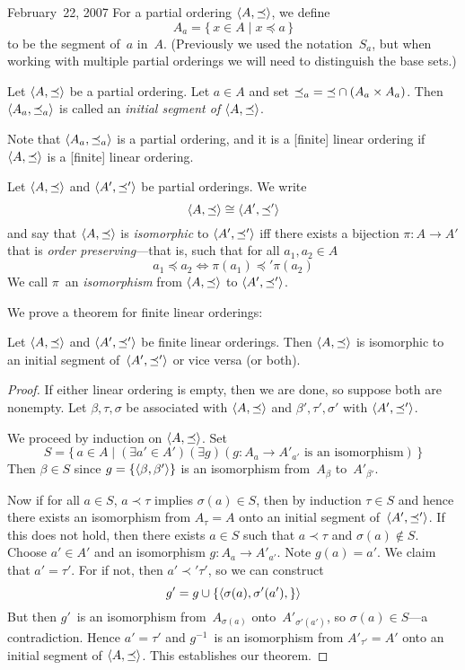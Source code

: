 \begin{lecture}{February~22, 2007}
For a partial ordering \(\langle{A},{\preceq}\rangle\), we define
\[A_a=\{\,x\in A\mid x\preceq a\,\}\]
to be the segment of~\(a\) in~\(A\). (Previously we used the notation~\(S_a\), but when working with multiple partial orderings we will need to distinguish the base sets.)
\begin{defn}
Let \(\langle{A},{\preceq}\rangle\) be a partial ordering. Let \(a\in A\) and set \({\preceq_a}={\preceq}\cap(A_a\times A_a)\). Then \(\langle{A_a},{\preceq_a}\rangle\) is called an \emph{initial segment of \(\langle{A},{\preceq}\rangle\)}.
\end{defn}
\noindent Note that \(\langle{A_a},{\preceq_a}\rangle\) is a partial ordering, and it is a [finite] linear ordering if \(\langle{A},{\preceq}\rangle\) is a [finite] linear ordering.
\begin{defn}
Let \(\langle{A},{\preceq}\rangle\) and \(\langle{A'},{\preceq'}\rangle\) be partial orderings. We write
\[\langle{A},{\preceq}\rangle\cong\langle{A'},{\preceq'}\rangle\]
and say that \(\langle{A},{\preceq}\rangle\) is \emph{isomorphic} to \(\langle{A'},{\preceq'}\rangle\) iff there exists a bijection \(\pi:A\to A'\) that is \emph{order preserving}---that is, such that for all \(a_1,a_2\in A\)
\[a_1\preceq a_2\iff\pi(a_1)\preceq'\pi(a_2)\]
We call \(\pi\)~an \emph{isomorphism} from \(\langle{A},{\preceq}\rangle\) to \(\langle{A'},{\preceq'}\rangle\).
\end{defn}

We prove a theorem for finite linear orderings:
\begin{thm}
Let \(\langle{A},{\preceq}\rangle\) and \(\langle{A'},{\preceq'}\rangle\) be finite linear orderings. Then \(\langle{A},{\preceq}\rangle\) is isomorphic to an initial segment of~\(\langle{A'},{\preceq'}\rangle\) or vice versa (or both).
\end{thm}
\begin{proof}
If either linear ordering is empty, then we are done, so suppose both are nonempty. Let \(\beta,\tau,\sigma\) be associated with \(\langle{A},{\preceq}\rangle\) and \(\beta',\tau',\sigma'\) with \(\langle{A'},{\preceq'}\rangle\).

We proceed by induction on \(\langle{A},{\preceq}\rangle\). Set
\[S=\{\,a\in A\mid (\exists a'\in A')(\exists g)(g:A_a\to A'_{a'}\text{ is an isomorphism})\,\}\]
Then \(\beta\in S\) since \(g=\{\langle{\beta},{\beta'}\rangle\}\) is an isomorphism from~\(A_{\beta}\) to~\(A'_{\beta'}\).

Now if for all \(a\in S\), \(a\prec\tau\) implies \(\sigma(a)\in S\), then by induction \(\tau\in S\) and hence there exists an isomorphism from \(A_{\tau}=A\) onto an initial segment of~\(\langle{A'},{\preceq'}\rangle\). If this does not hold, then there exists \(a\in S\) such that \(a\prec\tau\) and \(\sigma(a)\not\in S\). Choose \(a'\in A'\) and an isomorphism \(g:A_a\to A'_{a'}\). Note \(g(a)=a'\). We claim that \(a'=\tau'\). For if not, then \(a'\prec'\tau'\), so we can construct
\[g'=g\cup\{\langle{\sigma(a),\sigma'(a')},{\}}\rangle\]
But then \(g'\)~is an isomorphism from~\(A_{\sigma(a)}\) onto~\(A'_{\sigma'(a')}\), so \(\sigma(a)\in S\)---a contradiction. Hence \(a'=\tau'\) and \(g^{-1}\)~is an isomorphism from \(A'_{\tau'}=A'\) onto an initial segment of \(\langle{A},{\preceq}\rangle\). This establishes our theorem.
\end{proof}


\end{lecture}
